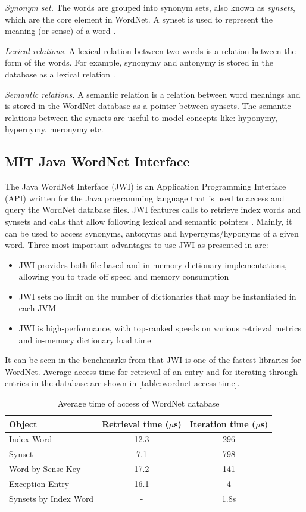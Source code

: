 {\em Synonym set.} The words are grouped into synonym sets, also known as {\em synsets}, which are the core element in WordNet. A synset is used to represent the meaning (or sense) of a word \cite{Miller1995}.

{\em Lexical relations.} A lexical relation between two words is a relation between the form of the words. For example, synonymy and antonymy is stored in the database as a lexical relation \cite{Miller1990}.

{\em Semantic relations.} A semantic relation is a relation between word meanings and is stored in the WordNet database as a pointer between synsets. The semantic relations between the synsets are useful to model concepts like: hyponymy, hypernymy, meronymy etc.

\subsection{MIT Java WordNet Interface}
\label{sub-sec:wordnet-jwi}

The Java WordNet Interface (JWI) is an Application Programming Interface (API) written for the Java programming language that is used to access and query the WordNet database files. JWI features calls to retrieve index words and synsets and calls that allow following lexical and semantic pointers \cite{Finlayson2011}. Mainly, it can be used to access synonyms, antonyms and hypernyms/hyponyms of a given word. Three most important advantages to use JWI as presented in \cite{Finlayson2013} are:
\begin{itemize}
  \item JWI provides both file-based and in-memory dictionary implementations, allowing you to trade off speed and memory consumption
  \item JWI sets no limit on the number of dictionaries that may be instantiated in each JVM
  \item JWI is high-performance, with top-ranked speeds on various retrieval metrics and in-memory dictionary load time
\end{itemize}
It can be seen in the benchmarks from \cite{Finlayson2013} that JWI is one of the fastest libraries for WordNet. Average access time for retrieval of an entry and for iterating through entries in the database are shown in \autoref{table:wordnet-access-time}.

\begin{table}[htb]
  \centering
  \begin{tabular}{lcc}
    Object & Retrieval time ($\mu$s) & Iteration time ($\mu$s) \\
    \hline
    Index Word & 12.3 & 296 \\
    Synset & 7.1 & 798\\
    Word-by-Sense-Key & 17.2 & 141\\
    Exception Entry & 16.1 & 4 \\
    Synsets by Index Word & - & 1.8s \\
  \end{tabular}
  \caption{Average time of access of WordNet database}
  \label{table:wordnet-access-time}
\end{table}

